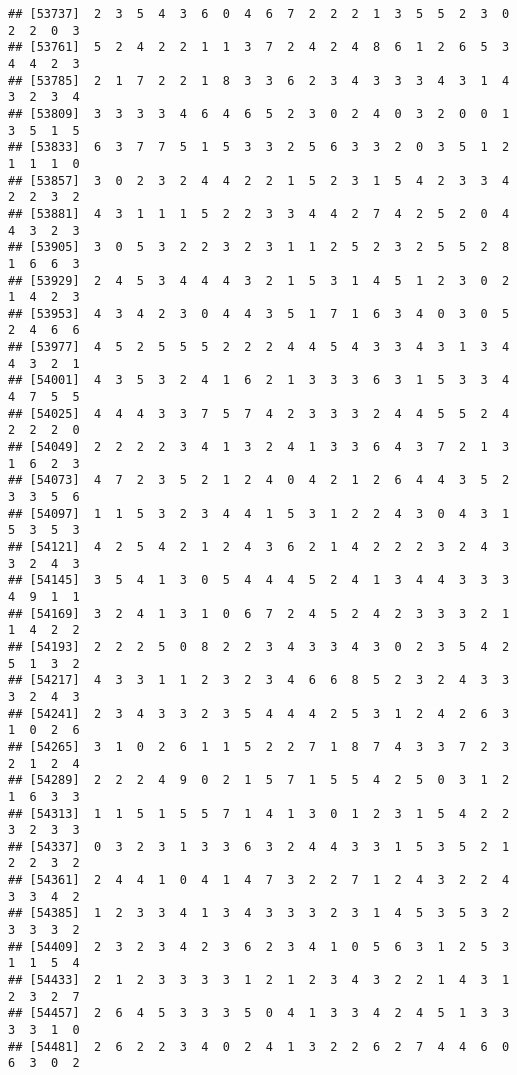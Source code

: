 \documentclass[
]{article}
\begin{document}
\begin{verbatim}
## [53737]  2  3  5  4  3  6  0  4  6  7  2  2  2  1  3  5  5  2  3  0  2  2  0  3
## [53761]  5  2  4  2  2  1  1  3  7  2  4  2  4  8  6  1  2  6  5  3  4  4  2  3
## [53785]  2  1  7  2  2  1  8  3  3  6  2  3  4  3  3  3  4  3  1  4  3  2  3  4
## [53809]  3  3  3  3  4  6  4  6  5  2  3  0  2  4  0  3  2  0  0  1  3  5  1  5
## [53833]  6  3  7  7  5  1  5  3  3  2  5  6  3  3  2  0  3  5  1  2  1  1  1  0
## [53857]  3  0  2  3  2  4  4  2  2  1  5  2  3  1  5  4  2  3  3  4  2  2  3  2
## [53881]  4  3  1  1  1  5  2  2  3  3  4  4  2  7  4  2  5  2  0  4  4  3  2  3
## [53905]  3  0  5  3  2  2  3  2  3  1  1  2  5  2  3  2  5  5  2  8  1  6  6  3
## [53929]  2  4  5  3  4  4  4  3  2  1  5  3  1  4  5  1  2  3  0  2  1  4  2  3
## [53953]  4  3  4  2  3  0  4  4  3  5  1  7  1  6  3  4  0  3  0  5  2  4  6  6
## [53977]  4  5  2  5  5  5  2  2  2  4  4  5  4  3  3  4  3  1  3  4  4  3  2  1
## [54001]  4  3  5  3  2  4  1  6  2  1  3  3  3  6  3  1  5  3  3  4  4  7  5  5
## [54025]  4  4  4  3  3  7  5  7  4  2  3  3  3  2  4  4  5  5  2  4  2  2  2  0
## [54049]  2  2  2  2  3  4  1  3  2  4  1  3  3  6  4  3  7  2  1  3  1  6  2  3
## [54073]  4  7  2  3  5  2  1  2  4  0  4  2  1  2  6  4  4  3  5  2  3  3  5  6
## [54097]  1  1  5  3  2  3  4  4  1  5  3  1  2  2  4  3  0  4  3  1  5  3  5  3
## [54121]  4  2  5  4  2  1  2  4  3  6  2  1  4  2  2  2  3  2  4  3  3  2  4  3
## [54145]  3  5  4  1  3  0  5  4  4  4  5  2  4  1  3  4  4  3  3  3  4  9  1  1
## [54169]  3  2  4  1  3  1  0  6  7  2  4  5  2  4  2  3  3  3  2  1  1  4  2  2
## [54193]  2  2  2  5  0  8  2  2  3  4  3  3  4  3  0  2  3  5  4  2  5  1  3  2
## [54217]  4  3  3  1  1  2  3  2  3  4  6  6  8  5  2  3  2  4  3  3  3  2  4  3
## [54241]  2  3  4  3  3  2  3  5  4  4  4  2  5  3  1  2  4  2  6  3  1  0  2  6
## [54265]  3  1  0  2  6  1  1  5  2  2  7  1  8  7  4  3  3  7  2  3  2  1  2  4
## [54289]  2  2  2  4  9  0  2  1  5  7  1  5  5  4  2  5  0  3  1  2  1  6  3  3
## [54313]  1  1  5  1  5  5  7  1  4  1  3  0  1  2  3  1  5  4  2  2  3  2  3  3
## [54337]  0  3  2  3  1  3  3  6  3  2  4  4  3  3  1  5  3  5  2  1  2  2  3  2
## [54361]  2  4  4  1  0  4  1  4  7  3  2  2  7  1  2  4  3  2  2  4  3  3  4  2
## [54385]  1  2  3  3  4  1  3  4  3  3  3  2  3  1  4  5  3  5  3  2  3  3  3  2
## [54409]  2  3  2  3  4  2  3  6  2  3  4  1  0  5  6  3  1  2  5  3  1  1  5  4
## [54433]  2  1  2  3  3  3  3  1  2  1  2  3  4  3  2  2  1  4  3  1  2  3  2  7
## [54457]  2  6  4  5  3  3  3  5  0  4  1  3  3  4  2  4  5  1  3  3  3  3  1  0
## [54481]  2  6  2  2  3  4  0  2  4  1  3  2  2  6  2  7  4  4  6  0  6  3  0  2

\end{verbatim}
\end{document}
